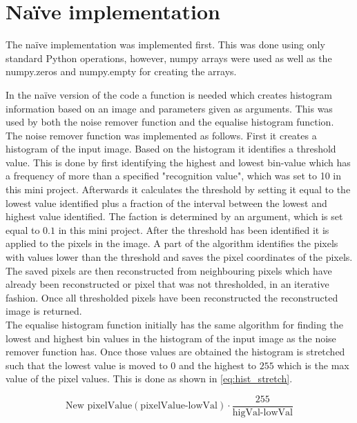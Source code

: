 \section{Na\"ive implementation}
The na\"ive implementation was implemented first. This was done using only standard Python operations, however, numpy arrays were used as well as the numpy.zeros and numpy.empty for creating the arrays. 

In the na\"ive version of the code a function is needed which creates histogram information based on an image and parameters given as arguments. This was used by both the noise remover function and the equalise histogram function. \\

The noise remover function was implemented as follows. First it creates a histogram of the input image. Based on the histogram it identifies a threshold value. This is done by first identifying the highest and lowest bin-value which has a frequency of more than a specified "recognition value", which was set to 10 in this mini project. Afterwards it calculates the threshold by setting it equal to the lowest value identified plus a fraction of the interval between the lowest and highest value identified. The faction is determined by an argument, which is set equal to $ 0.1 $ in this mini project. After the threshold has been identified it is applied to the pixels in the image. A part of the algorithm identifies the pixels with values lower than the threshold and saves the pixel coordinates of the pixels. The saved pixels are then reconstructed from neighbouring pixels which have already been reconstructed or pixel that was not thresholded, in an iterative fashion. Once all thresholded pixels have been reconstructed the reconstructed image is returned. \\

The equalise histogram function initially has the same algorithm for finding the lowest and highest bin values in the histogram of the input image as the noise remover function has. Once those values are obtained the histogram is stretched such that the lowest value is moved to $ 0 $ and the highest to $ 255 $ which is the max value of the pixel values. This is done as shown in \autoref{eq:hist_stretch}.

\begin{equation}\label{eq:hist_stretch}
	\text{New~pixelValue} (\text{pixelValue-lowVal})\cdot\frac{255}{\text{higVal-lowVal}}
\end{equation}


